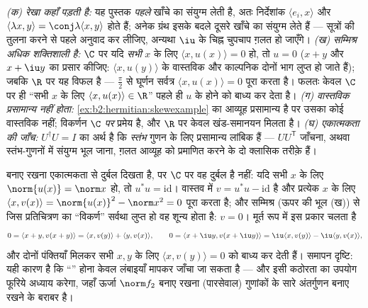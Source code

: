 \begin{remark}[सामान्य भूलें]
\emph{(क) रेखा कहाँ पड़ती है:} यह पुस्तक \emph{पहले} खाँचे का संयुग्म
लेती है, अतः निर्देशांक $\langle e_i, x\rangle$ और $\langle\lambda x, y\rangle = \conj\lambda\langle x,
y\rangle$ होते हैं; अनेक ग्रंथ इसके बदले दूसरे
खाँचे का संयुग्म लेते हैं --- सूत्रों की तुलना करने से पहले अनुवाद कर
लीजिए, अन्यथा $\iu$ के चिह्न चुपचाप ग़लत हो जाएँगे। \emph{(ख) सम्मिश्र
 अधिक शक्तिशाली है:} $\C$ पर यदि \emph{सभी} $x$ के लिए $\langle x, u(x)\rangle = 0$ हो, तो
$u = 0$ ($x + y$ और $x + \iu y$ का प्रसार कीजिए: $\langle x, u(y)\rangle$ के वास्तविक और काल्पनिक दोनों भाग
लुप्त हो जाते हैं); जबकि $\R$ पर यह विफल है --- $\frac\pi2$ से घूर्णन सर्वत्र
$\langle x, u(x)\rangle = 0$ पूरा करता है। फलतः केवल $\C$ पर ही ``सभी $x$ के लिए $\langle x, u(x)\rangle \in \R$'' पहले ही
$u$ के  होने को बाध्य कर देता है। \emph{(ग) वास्तविक प्रसामान्य
 नहीं होता:} \cref{ex:b2:hermitian:skewexample} का आव्यूह प्रसामान्य है पर उसका कोई वास्तविक
 नहीं;  विकर्णन $\C$ \emph{पर} प्रमेय है, और $\R$ पर
केवल खंड-समानयन मिलता है। \emph{(घ) एकात्मकता की जाँच:} $U^\dagger U = I$ का अर्थ है कि
\emph{स्तंभ}  गुणन के लिए प्रसामान्य लांबिक हैं --- $UU^{\mathsf T}$ जाँचना,
अथवा स्तंभ-गुणनों में संयुग्म भूल जाना, ग़लत आव्यूह को प्रमाणित करने के
दो क्लासिक तरीक़े हैं।
\end{remark}

\begin{example}[समदूरिक प्रतिचित्रण ठीक एकात्मक ही हैं]\label{ex:b2:hermitian:isometry}
 बनाए रखना एकात्मकता से दुर्बल दिखता है, पर $\C$ पर वह दुर्बल है
नहीं: यदि सभी $x$ के लिए $\norm{u(x)} = \norm x$ हो, तो $u^*u =
\mathrm{id}$। वास्तव में $v = u^*u - \mathrm{id}$  है और
प्रत्येक $x$ के लिए $\langle x, v(x)\rangle = \norm{u(x)}^2 - \norm x^2 =
0$ पूरा करता है; और सम्मिश्र  (ऊपर की भूल (ख))
से जिस प्रतिचित्रण का ``विकर्ण'' सर्वथा लुप्त हो वह शून्य होता है: $v = 0$।
मूर्त रूप में  इस प्रकार चलता है
\[
0 = \langle x + y, v(x+y)\rangle
= \langle x, v(y)\rangle + \langle y, v(x)\rangle,
\qquad
0 = \langle x + \iu y, v(x + \iu y)\rangle
= \iu\langle x, v(y)\rangle - \iu\langle y, v(x)\rangle ,
\]
और दोनों पंक्तियाँ मिलकर सभी $x, y$ के लिए $\langle x, v(y)\rangle = 0$ को बाध्य कर देती हैं। समापन
दृष्टि: यही कारण है कि ``'' होना केवल लंबाइयाँ मापकर जाँचा जा सकता
है --- और इसी कठोरता का उपयोग फूरिये अध्याय करेगा, जहाँ ऊर्जा $\norm f_2$ बनाए
रखना (पारसेवाल) गुणांकों के सारे अंतर्गुणन बनाए रखने के बराबर है।
\end{example}

